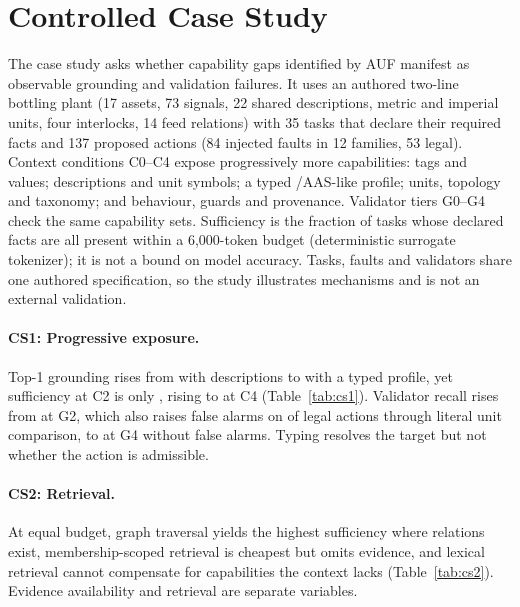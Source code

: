 \section{Controlled Case Study}
\label{sec:case}

The case study asks whether capability gaps identified by AUF manifest as observable
grounding and validation failures. It uses an authored two-line bottling plant (17 assets,
73 signals, 22 shared descriptions, metric and imperial units, four interlocks, 14 feed
relations) with 35 tasks that declare their required facts and 137 proposed actions
(84 injected faults in 12 families, 53 legal). Context conditions C0--C4 expose
progressively more capabilities: tags and values; descriptions and unit symbols; a typed
\opcua{}/AAS-like profile; units, topology and taxonomy; and behaviour, guards and
provenance. Validator tiers G0--G4 check the same capability sets. Sufficiency is the
fraction of tasks whose declared facts are all present within a 6,000-token budget
(deterministic surrogate tokenizer); it is not a bound on model accuracy. Tasks, faults and
validators share one authored specification, so the study illustrates mechanisms and is
not an external validation.



\paragraph{CS1: Progressive exposure.} Top-1 grounding rises from \CsTopCOne{} with
descriptions to \CsTopCTwo{} with a typed profile, yet sufficiency at C2 is only
\CsSuffCTwo{}, rising to \CsSuffCFour{} at C4 (Table~\ref{tab:cs1}). Validator recall rises
from \CsRecallGTwo{} at G2, which also raises false alarms on \CsFPRGTwo{} of legal actions
through literal unit comparison, to \CsRecallGFour{} at G4 without false alarms. Typing
resolves the target but not whether the action is admissible.




\paragraph{CS2: Retrieval.} At equal budget, graph traversal yields the highest
sufficiency where relations exist, membership-scoped retrieval is cheapest but omits
evidence, and lexical retrieval cannot compensate for capabilities the context lacks
(Table~\ref{tab:cs2}). Evidence availability and retrieval are separate variables.

